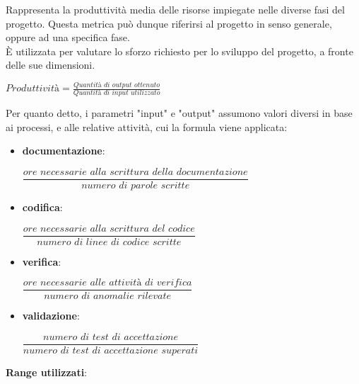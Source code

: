 Rappresenta la produttività media delle risorse impiegate nelle diverse fasi del progetto. Questa metrica può dunque riferirsi al progetto in senso generale, oppure ad una specifica fase.\\ \`E utilizzata per valutare lo sforzo richiesto per lo sviluppo del progetto, a fronte delle sue dimensioni.
\begin{center}
\begin{math}
	\textit{Produttività} = \frac	{\textit{Quantità di output ottenuto}}
									{\textit{Quantità di input utilizzato}}
\end{math}
\end{center}
Per quanto detto, i parametri "input" e "output" assumono valori diversi in base ai processi, e alle relative attività, cui la formula viene applicata:
\begin{itemize}
	\item \textbf{documentazione}:
	\begin{center} 
		\begin{math}
			\dfrac	{\textit{ore necessarie alla scrittura della documentazione}}
					{\textit{numero di parole scritte}}
		\end{math}
	\end{center}	
	\item \textbf{codifica}:
	\begin{center} 
		\begin{math}
			\dfrac	{\textit{ore necessarie alla scrittura del codice}}
					{\textit{numero di linee di codice scritte}}
		\end{math}
	\end{center}	
	\item \textbf{verifica}:
	\begin{center} 
		\begin{math}
			\dfrac	{\textit{ore necessarie alle attivit\`a di verifica}}
					{\textit{numero di anomalie rilevate}}
		\end{math}
	\end{center}		
	\item \textbf{validazione}: 
	\begin{center}
		\begin{math}
			\dfrac	{\textit{numero di test di accettazione}}
					{\textit{numero di test di accettazione superati}}
		\end{math}
	\end{center}		
\end{itemize}

\textbf{Range utilizzati}: \\

